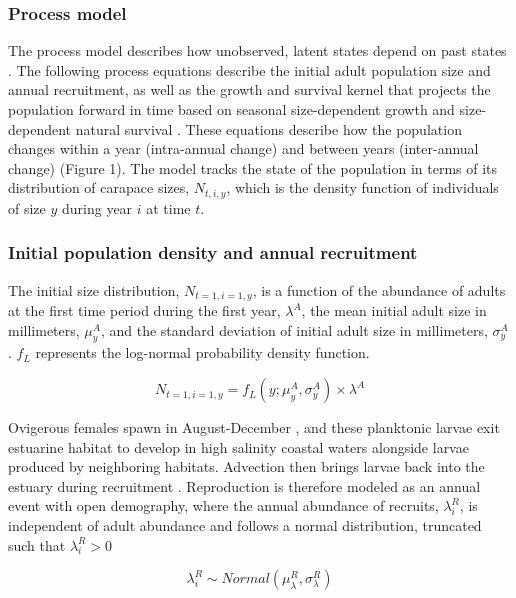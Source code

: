 \documentclass{article}
\begin{document}
\subsubsection{Process model}

The process model describes how unobserved, latent states depend on past states \parencite{auger2021guide}. The following process equations describe the initial adult population size and annual recruitment, as well as the growth and survival kernel that projects the population forward in time based on seasonal size-dependent growth and size-dependent natural survival \parencite{rees2014building}. These equations describe how the population changes within a year (intra-annual change) and between years (inter-annual change) (Figure 1). The model tracks the state of the population in terms of its distribution of carapace sizes, $N_{t, i, y}$, which is the density function of individuals of size $y$ during year $i$ at time $t$. 

\subsubsection*{Initial population density and annual recruitment}

The initial size distribution, $N_{t=1, i=1, y}$, is a function of the abundance of adults at the first time period during the first year, $\lambda^{A}$, the mean initial adult size in millimeters, $\mu^A_{y}$, and the standard deviation of initial adult size in millimeters, $\sigma^A_{y}$. $f_L$ represents the log-normal probability density function.

\begin{equation}
N_{t=1, i=1, y} = f_L(y; \mu^A_{y}, \sigma^A_{y}) \times \lambda^A
\end{equation}

Ovigerous females spawn in August-December \parencite{klassen2007biological}, and these planktonic larvae exit estuarine habitat to develop in high salinity coastal waters alongside larvae produced by neighboring habitats. Advection then brings larvae back into the estuary during recruitment \parencite{young2019life}. Reproduction is therefore modeled as an annual event with open demography, where the annual abundance of recruits, $\lambda^R_i$, is independent of adult abundance and follows a normal distribution, truncated such that $\lambda^R_i > 0$  

\begin{equation}
\lambda^R_i \sim Normal(\mu^R_{\lambda}, \sigma^R_{\lambda})
\end{equation}
\end{document}
